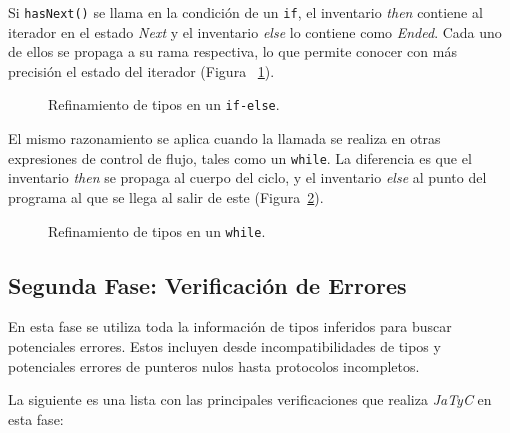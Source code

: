 Si \texttt{hasNext()} se llama en la condición de un \texttt{if}, el inventario \textit{then} contiene al iterador en el estado \textit{Next} y el inventario \textit{else} lo contiene como \textit{Ended}. Cada uno de ellos se propaga a su rama respectiva, lo que permite conocer con más precisión el estado del iterador (Figura ~\ref{jatyc:if}).

\begin{figure}[htbp]
    \centering
    
    \caption{Refinamiento de tipos en un \texttt{if-else}.}
    \label{jatyc:if}
\end{figure}

El mismo razonamiento se aplica cuando la llamada se realiza en otras expresiones de control de flujo, tales como un \texttt{while}. La diferencia es que el inventario \textit{then} se propaga al cuerpo del ciclo, y el inventario \textit{else} al punto del programa al que se llega al salir de este (Figura~\ref{jatyc:while}).

\begin{figure}[htbp]
    \centering
    
    \caption{Refinamiento de tipos en un \texttt{while}.}
    \label{jatyc:while}
\end{figure}

\subsection{Segunda Fase: Verificación de Errores}

En esta fase se utiliza toda la información de tipos inferidos para buscar potenciales errores. Estos incluyen desde incompatibilidades de tipos y potenciales errores de punteros nulos hasta protocolos incompletos.

La siguiente es una lista con las principales verificaciones que realiza \textit{JaTyC} en esta fase:

